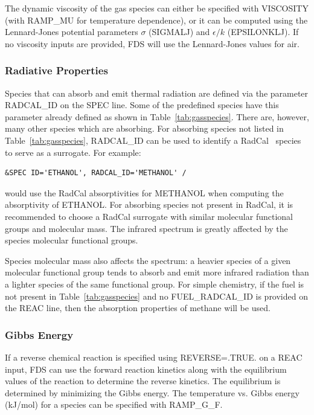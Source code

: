 \documentclass[11pt]{book}
\begin{document}
The dynamic viscosity of the gas species can either be specified with {\ct VISCOSITY} (with {\ct RAMP\_MU} for temperature dependence), or it can be computed  using the Lennard-Jones potential parameters $\sigma$ ({\ct SIGMALJ}) and $\epsilon/k$ ({\ct EPSILONKLJ}).  If no viscosity inputs are provided, FDS will use the Lennard-Jones values for air.

\subsubsection{Radiative Properties}
\label{info:radiative_spec_props}

Species that can absorb and emit thermal radiation are defined via the parameter {\ct RADCAL\_ID} on the {\ct SPEC} line.  Some of the predefined species have this parameter already defined as shown in Table~\ref{tab:gasspecies}.  There are, however, many other species which are absorbing.  For absorbing species not listed in Table~\ref{tab:gasspecies}, {\ct RADCAL\_ID} can be used to identify a RadCal~\cite{RadCal} species to serve as a surrogate. For example:
\begin{lstlisting}
&SPEC ID='ETHANOL', RADCAL_ID='METHANOL' /
\end{lstlisting}
would use the RadCal absorptivities for {\ct METHANOL} when computing the absorptivity of {\ct ETHANOL}. For absorbing species not present in RadCal, it is recommended to choose a RadCal surrogate with similar molecular functional groups and molecular mass. The infrared spectrum is greatly affected by the species molecular functional groups.

Species molecular mass also affects the spectrum: a heavier species of a given molecular functional group tends to absorb and emit more infrared radiation than a lighter species of the same functional group.  For simple chemistry, if the fuel is not present in Table~\ref{tab:gasspecies} and no {\ct FUEL\_RADCAL\_ID} is provided on the {\ct REAC} line, then the absorption properties of methane will be used.

\subsubsection{Gibbs Energy}
If a reverse chemical reaction is specified using {\ct REVERSE=.TRUE.} on a {\ct REAC} input, FDS can use the forward reaction kinetics along with the equilibrium values of the reaction to determine the reverse kinetics.  The equilibrium is determined by minimizing the Gibbs energy.  The temperature vs. Gibbs energy (kJ/mol) for a species can be specified with {\ct RAMP\_G\_F}.
\end{document}
